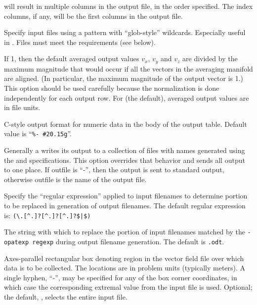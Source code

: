 \begin{description}
  will result in multiple columns in the output file, in the order
  specified.  The index columns, if any, will be the first columns in
  the output file.
\item[\optkey{-ipat pattern}]
  Specify input files using a pattern with ``glob-style'' wildcards.
  Especially useful in \DOS.  Files must meet the 
  requirements (see below).
\item[\optkey{-normalize \boa 0\pipe 1\bca}]
  If 1, then the default averaged output values $v_x$, $v_y$ and $v_z$
  are divided by the maximum magnitude that would occur if all the
  vectors in the averaging manifold are aligned.  (In particular, the
  maximum magnitude of the output vector is 1.)  This option should
  be used carefully because the normalization is done independently for
  each output row.  For 
  (the default), averaged output values are in file units.
\item[\optkey{-numfmt fmt}]
  C-style output format for numeric data in the body of the output
  table.  Default value is ``\verb+%- #20.15g+''.
\item[\optkey{-onefile outfile}]
  Generally a  writes its output to a collection of files
  with names generated using the  and 
  specifications.  This option overrides that behavior and sends all
  output to one place.  If outfile is ``-'', then the output is sent
  to standard output, otherwise outfile is the name of the output file.
\item[\optkey{-opatexp regexp}]
  Specify the ``regular expression'' applied to input filenames to
  determine portion to be replaced in generation of output filenames.
  The default regular expression is: {\verb!(\.[^.]?[^.]?[^.]?$|$)!}
\item[\optkey{-opatsub sub}]
  The string with which to replace the portion of input filenames
  matched by the {\tt -opatexp regexp} during output filename
  generation.  The default is {\verb!.odt!}.
\item[\optkey{-region xmin ymin zmin xmax ymax zmax}]
  Axes-parallel rectangular box denoting region in the vector field
  file over which data is to be collected.  The locations are in
  problem units (typically meters).  A single hyphen, ``-'', may be
  specified for any of the box corner coordinates, in which case the
  corresponding extremal value from the input file is used.  Optional;
  the default, , selects the entire input file.
\item[\optkey{-rregion rxmin rymin rzmin rxmax rymax rzmax}]

\end{description}
